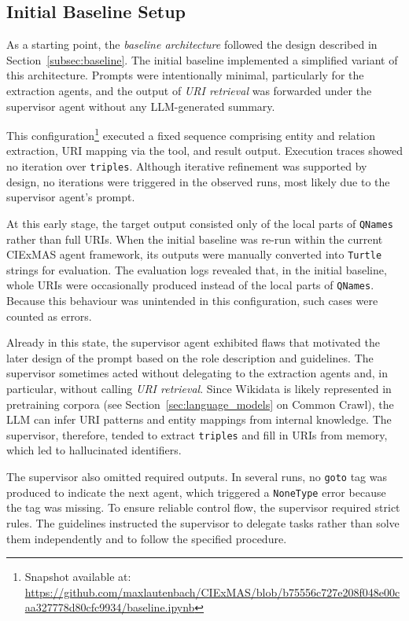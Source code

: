 \documentclass[a4paper,oneside,bibliography=totoc]{scrbook}
\begin{document}
\subsection{Initial Baseline Setup}
\label{subsec:initial_baseline_setup}

As a starting point, the \textit{baseline architecture} followed the design described in Section~\ref{subsec:baseline}. The initial baseline implemented a simplified variant of this architecture. Prompts were intentionally minimal, particularly for the extraction agents, and the output of \textit{\ac{URI} retrieval} was forwarded under the supervisor agent without any \ac{LLM}-generated summary.

This configuration\footnote{Snapshot available at: \url{https://github.com/maxlautenbach/CIExMAS/blob/b75556c727e208f048e00caa327778d80cfc9934/baseline.ipynb}} executed a fixed sequence comprising entity and relation extraction, \ac{URI} mapping via the tool, and result output. Execution traces showed no iteration over \texttt{triples}. Although iterative refinement was supported by design, no iterations were triggered in the observed runs, most likely due to the supervisor agent's prompt.

At this early stage, the target output consisted only of the local parts of \texttt{QNames} rather than full \acp{URI}. When the initial baseline was re-run within the current CIExMAS agent framework, its outputs were manually converted into \texttt{Turtle} strings for evaluation. The evaluation logs revealed that, in the initial baseline, whole \acp{URI} were occasionally produced instead of the local parts of \texttt{QNames}. Because this behaviour was unintended in this configuration, such cases were counted as errors.

Already in this state, the supervisor agent exhibited flaws that motivated the later design of the prompt based on the role description and guidelines. The supervisor sometimes acted without delegating to the extraction agents and, in particular, without calling \textit{\ac{URI} retrieval}. Since Wikidata is likely represented in pretraining corpora (see Section~\ref{sec:language_models} on Common Crawl), the \ac{LLM} can infer \ac{URI} patterns and entity mappings from internal knowledge. The supervisor, therefore, tended to extract \texttt{triples} and fill in \acp{URI} from memory, which led to hallucinated identifiers.

The supervisor also omitted required outputs. In several runs, no \texttt{goto} tag was produced to indicate the next agent, which triggered a \texttt{NoneType} error because the tag was missing. To ensure reliable control flow, the supervisor required strict rules. The guidelines instructed the supervisor to delegate tasks rather than solve them independently and to follow the specified procedure.
\end{document}
